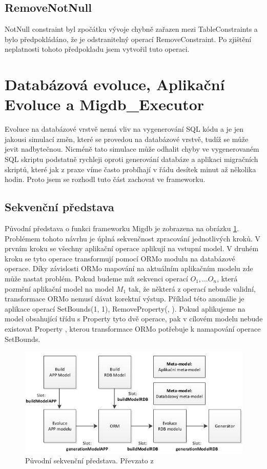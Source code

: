 \documentclass[11pt,twoside,a4paper]{book}
\begin{document}
\subsection{RemoveNotNull}
NotNull constraint byl zpočátku vývoje chybně zařazen mezi TableConstraints a
bylo předpokládáno, že je odstranitelný operací RemoveConstraint. Po zjištění
neplatnosti tohoto předpokladu jsem vytvořil tuto operaci.

\section{Databázová evoluce, Aplikační Evoluce a Migdb\_Executor}
Evoluce na databázové vrstvě nemá vliv na vygenerování SQL kódu a je jen
jakousi simulací změn, které se provedou na databázové vrstvě, tudíž se může
jevit nadbytečnou. Nicméně tato simulace může odhalit chyby ve vygenerovaném
SQL skriptu podstatně rychleji oproti generování databáze a aplikaci migračních
skriptů, které jak z praxe víme často probíhají v řádu desítek minut až
několika hodin. Proto jsem se rozhodl tuto část zachovat ve frameworku.

\subsection{Sekvenční představa}
Původní představa o funkci frameworku Migdb je zobrazena na obrázku
\ref{fig:framework_seq}. Problémem tohoto návrhu je úplná sekvenčnost zpracování
jednotlivých kroků. V prvním kroku se všechny aplikační operace aplikují na
vstupní model. V druhém kroku se tyto operace transformují pomocí ORMo modulu na
databázové operace. Díky závislosti ORMo mapování na aktuálním aplikačním
modelu zde může nastat problém. Pokud budeme mít sekvenci operací $O_1,\ldots
O_n$, která pozmění aplikační model na model $M_1$ tak, že některá z operací
nebude validní, transformace ORMo nemusí dávat korektní výstup. Příklad této
anomálie je aplikace operací SetBounds(1, 1), RemoveProperty(, ).
Pokud aplikujeme na model obsahující třídu  s Property  tyto dvě
operace, pak v cílovém modelu nebude existovat Property , kterou
transformace ORMo potřebuje k namapování operace SetBounds.

\begin{figure}[H]
\begin{center}
\includegraphics[width=13cm]{figures/framework_cycle}
\caption{Původní sekvenční představa. Převzato z \cite{Tarant_bp}}
\label{fig:framework_seq}
\end{center}
\end{figure}
\end{document}
